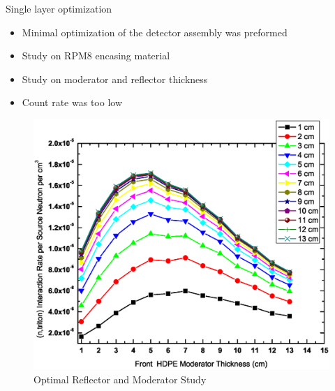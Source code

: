 \begin{frame}{Single layer optimization}
	\tiny
	\begin{itemize}
		\item Minimal optimization of the detector assembly was preformed
		\item Study on RPM8 encasing material
		\item Study on moderator and reflector thickness
		\item Count rate was too low
	\end{itemize}
	\begin{figure}
		\centering
		\includegraphics[height=0.55\textheight]{images/PS_50um_30LiF-InteractionRate-ShieldThickness.eps}
		\tiny \caption{Optimal Reflector and Moderator Study}
	\end{figure}
\end{frame}
